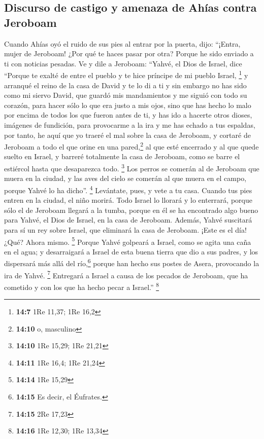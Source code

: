 \begin{paracol}{2}
{\subsection{Discurso de castigo y amenaza de Ahías contra
Jeroboam}\label{discurso-de-castigo-y-amenaza-de-ahuxedas-contra-jeroboam}}

 Cuando Ahías oyó el ruido de sus pies al entrar por la
puerta, dijo: ``¡Entra, mujer de Jeroboam! ¿Por qué te haces pasar por
otra? Porque he sido enviado a ti con noticias pesadas. 
Ve y dile a Jeroboam: ``Yahvé, el Dios de Israel, dice ``Porque te
exalté de entre el pueblo y te hice príncipe de mi pueblo Israel,
\footnote{\textbf{14:7} 1Re 11,37; 1Re 16,2}  y arranqué
el reino de la casa de David y te lo di a ti y sin embargo no has sido
como mi siervo David, que guardó mis mandamientos y me siguió con todo
su corazón, para hacer sólo lo que era justo a mis ojos, 
sino que has hecho lo malo por encima de todos los que fueron antes de
ti, y has ido a hacerte otros dioses, imágenes de fundición, para
provocarme a la ira y me has echado a tus espaldas,  por
tanto, he aquí que yo traeré el mal sobre la casa de Jeroboam, y cortaré
de Jeroboam a todo el que orine en una pared,\footnote{\textbf{14:10} o,
  masculino} al que esté encerrado y al que quede suelto en Israel, y
barreré totalmente la casa de Jeroboam, como se barre el estiércol hasta
que desaparezca todo. \footnote{\textbf{14:10} 1Re 15,29; 1Re 21,21}
 Los perros se comerán al de Jeroboam que muera en la
ciudad, y las aves del cielo se comerán al que muera en el campo, porque
Yahvé lo ha dicho''. \footnote{\textbf{14:11} 1Re 16,4; 1Re 21,24}
 Levántate, pues, y vete a tu casa. Cuando tus pies
entren en la ciudad, el niño morirá.  Todo Israel lo
llorará y lo enterrará, porque sólo el de Jeroboam llegará a la tumba,
porque en él se ha encontrado algo bueno para Yahvé, el Dios de Israel,
en la casa de Jeroboam.  Además, Yahvé suscitará para sí
un rey sobre Israel, que eliminará la casa de Jeroboam. ¡Este es el día!
¿Qué? Ahora mismo. \footnote{\textbf{14:14} 1Re 15,29} 
Porque Yahvé golpeará a Israel, como se agita una caña en el agua; y
desarraigará a Israel de esta buena tierra que dio a sus padres, y los
dispersará más allá del río,\footnote{\textbf{14:15} Es decir, el
  Éufrates.} porque han hecho sus postes de Asera, provocando la ira de
Yahvé. \footnote{\textbf{14:15} 2Re 17,23}  Entregará a
Israel a causa de los pecados de Jeroboam, que ha cometido y con los que
ha hecho pecar a Israel.'' \footnote{\textbf{14:16} 1Re 12,30; 1Re 13,34}


\end{paracol}
